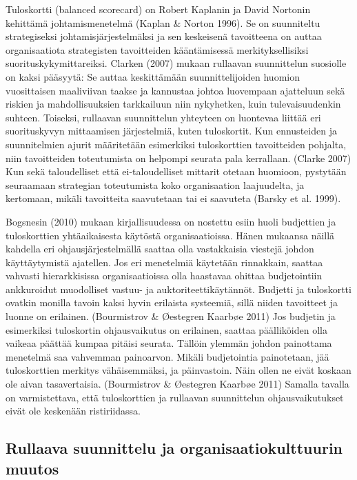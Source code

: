 \documentclass[12pt,a4paper,oneside,pdftex]{report}
\begin{document}
Tuloskortti (balanced scorecard) on Robert Kaplanin ja David Nortonin kehittämä johtamismenetelmä (Kaplan & Norton 1996). Se on suunniteltu strategiseksi johtamisjärjestelmäksi ja sen keskeisenä tavoitteena on auttaa organisaatiota strategisten tavoitteiden kääntämisessä merkityksellisiksi suorituskykymittareiksi. Clarken (2007) mukaan rullaavan suunnittelun suosiolle on kaksi pääsyytä: Se auttaa keskittämään suunnittelijoiden huomion vuosittaisen maaliviivan taakse ja kannustaa johtoa luovempaan ajatteluun sekä riskien ja mahdollisuuksien tarkkailuun niin nykyhetken, kuin tulevaisuudenkin suhteen. Toiseksi, rullaavan suunnittelun yhteyteen on luontevaa liittää eri suorituskyvyn mittaamisen järjestelmiä, kuten tuloskortit.  Kun ennusteiden ja suunnitelmien ajurit määritetään esimerkiksi tuloskorttien tavoitteiden pohjalta, niin tavoitteiden toteutumista on helpompi seurata pala kerrallaan. (Clarke 2007) Kun sekä taloudelliset että ei-taloudelliset mittarit otetaan huomioon, pystytään seuraamaan strategian toteutumista koko organisaation laajuudelta, ja kertomaan, mikäli tavoitteita saavutetaan tai ei saavuteta (Barsky et al. 1999).

Bogsnesin (2010) mukaan kirjallisuudessa on nostettu esiin huoli budjettien ja tuloskorttien yhtäaikaisesta käytöstä organisaatioissa. Hänen mukaansa näillä kahdella eri ohjausjärjestelmällä saattaa olla vastakkaisia viestejä johdon käyttäytymistä ajatellen. Jos eri menetelmiä käytetään rinnakkain, saattaa vahvasti hierarkkisissa organisaatioissa olla haastavaa ohittaa budjetointiin ankkuroidut muodolliset vastuu- ja auktoriteettikäytännöt. Budjetti ja tuloskortti ovatkin monilla tavoin kaksi hyvin erilaista systeemiä, sillä niiden tavoitteet ja luonne on erilainen.  (Bourmistrov & Øestegren Kaarbøe 2011) Jos budjetin ja esimerkiksi tuloskortin ohjausvaikutus on erilainen, saattaa päälliköiden olla vaikeaa päättää kumpaa pitäisi seurata. Tällöin ylemmän johdon painottama menetelmä saa vahvemman painoarvon. Mikäli budjetointia painotetaan, jää tuloskorttien merkitys vähäisemmäksi, ja päinvastoin. Näin ollen ne eivät koskaan ole aivan tasavertaisia. (Bourmistrov & Øestegren Kaarbøe 2011) Samalla tavalla on varmistettava, että tuloskorttien ja rullaavan suunnittelun ohjausvaikutukset eivät ole keskenään ristiriidassa.

\subsection{Rullaava suunnittelu ja organisaatiokulttuurin muutos}
\end{document}

